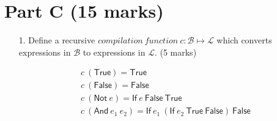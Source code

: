 \documentclass[a4paper,answers]{exam}
\begin{document}
\section*{Part C (15 marks)}
\begin{itemize} 
\item[1.] Define a recursive $compilation\ function\ c : \mathcal{B} \mapsto \mathcal{L}$ which converts expressions in $\mathcal{B}$ to expressions in $\mathcal{L}$. (5 marks)
\begin{solution}
    \begin{gather*}
        c\ (\mathsf{True}) = \mathsf{True}\\[0.3em]
        c\ (\mathsf{False}) = \mathsf{False}\\[0.3em]
        c\ (\mathsf{Not}\ e) = \mathsf{If}\ e\ \mathsf{False}\ \mathsf{True}\\[0.3em]
        c\ (\mathsf{And}\ e_1\ e_2) = \mathsf{If}\ e_1\ (\mathsf{If}\ e_2\ \mathsf{True}\ \mathsf{False})\ \mathsf{False}
    \end{gather*}
\end{solution}


\end{itemize}
\end{document}
